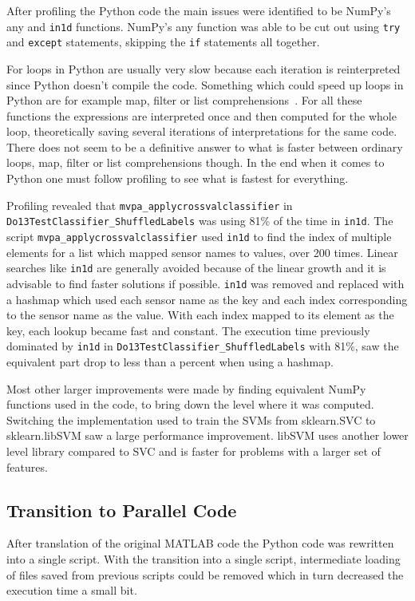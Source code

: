 \documentclass[12pt, a4paper]{article}
\begin{document}
After profiling the Python code the main issues were identified to be NumPy's any and \texttt{in1d} functions.
NumPy's any function was able to be cut out using \texttt{try} and \texttt{except} statements, skipping the \texttt{if} statements all together.%

For loops in Python are usually very slow because each iteration is reinterpreted since Python doesn't compile the code.
Something which could speed up loops in Python are for example map, filter or list comprehensions~\cite{Py:map, Py:filter, Py:listComprehension}. 
For all these functions the expressions are interpreted once and then computed for the whole loop, theoretically saving several iterations of interpretations for the same code. 
There does not seem to be a definitive answer to what is faster between ordinary loops, map, filter or list comprehensions though.
In the end when it comes to Python one must follow profiling to see what is fastest for everything.

Profiling revealed that \texttt{mvpa\_applycrossvalclassifier} in \\\texttt{Do13TestClassifier\_ShuffledLabels} was using 81\% of the time in \texttt{in1d}.
The script \texttt{mvpa\_applycrossvalclassifier} used \texttt{in1d} to find the index of multiple elements for a list which mapped sensor names to values, over 200 times.
Linear searches like \texttt{in1d} are generally avoided because of the linear growth and it is advisable to find faster solutions if possible.
\texttt{in1d} was removed and replaced with a hashmap which used each sensor name as the key and each index corresponding to the sensor name as the value.
With each index mapped to its element as the key, each lookup became fast and constant.
The execution time previously dominated by \texttt{in1d} in \texttt{Do13TestClassifier\_ShuffledLabels} with 81\%, saw the equivalent part drop to less than a percent when using a hashmap.

Most other larger improvements were made by finding equivalent NumPy functions used in the code, to bring down the level where it was computed.
Switching the implementation used to train the SVMs from sklearn.SVC to sklearn.libSVM saw a large performance improvement.
libSVM uses another lower level library compared to SVC and is faster for problems with a larger set of features.

\subsection{Transition to Parallel Code}
After translation of the original MATLAB code the Python code was
rewritten into a single script.
With the transition into a single script, intermediate loading of files saved from previous scripts could be removed which in turn decreased the execution time a small bit.
\end{document}
